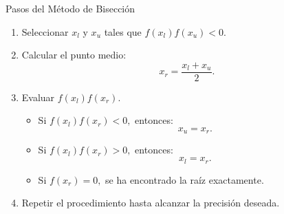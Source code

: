 \documentclass[../../main.tex]{subfiles}
\begin{document}

\begin{frame}{Pasos del Método de Bisección}

\begin{enumerate}
    \item Seleccionar \(x_l\) y \(x_u\) tales que \(f(x_l)f(x_u)<0.\)
    \item Calcular el punto medio:
    \[
    x_r=
    \frac{x_l+x_u}{2}.
    \]
    \item Evaluar
    \(
    f(x_l)f(x_r).
    \)
    \begin{itemize}
        \item Si
        \(
        f(x_l)f(x_r)<0,
        \)
        entonces:
        \[
        x_u=x_r.
        \]
        \item Si
        \(
        f(x_l)f(x_r)>0,
        \)
        entonces:
        \[
        x_l=x_r.
        \]
        \item Si
        \(
        f(x_r)=0,
        \)
        se ha encontrado la raíz exactamente.
    \end{itemize}
    \item Repetir el procedimiento hasta alcanzar la precisión deseada.
\end{enumerate}

\end{frame}


\end{document}
